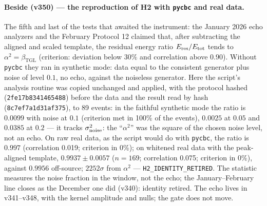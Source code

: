 \documentclass[11pt]{article}
\newcommand{\bTGL}{\beta_{\mathrm{TGL}}}\newcommand{\Msun}{M_{\odot}}\newcommand{\TGL}{\mathrm{TGL}}
\theoremstyle{definition}\newtheorem{deriv}{Derivation}
\begin{document}
\paragraph*{Beside (v350) --- the reproduction of H2 with \texttt{pycbc} and real data.} The fifth and last of the tests that awaited the instrument: the January 2026 echo analyzers and the February Protocol 12 claimed that, after subtracting the aligned and scaled template, the residual energy ratio $E_{\rm res}/E_{\rm tot}$ tends to $\alpha^2=\bTGL$ (criterion: deviation below $30\%$ and correlation above $0.90$). Without \texttt{pycbc} they ran in synthetic mode: data equal to the consistent generator plus noise of level $0.1$, no echo, against the noiseless generator. Here the script's analysis routine was copied unchanged and applied, with the protocol hashed (\texttt{2fe17b8341465488}) before the data and the result read by hash (\texttt{8c7ef7a1d31af375}), to 89 events: in the faithful synthetic mode the ratio is $0.0099$ with noise at $0.1$ (criterion met in 100\% of the events), $0.0025$ at $0.05$ and $0.0385$ at $0.2$ --- it tracks $\sigma_{\rm noise}^2$: the ``$\alpha^2$'' was the square of the chosen noise level, not an echo. On raw real data, as the script would do with \texttt{pycbc}, the ratio is $0.997$ (correlation 0.019; criterion in 0\%); on whitened real data with the peak-aligned template, $0.9937\pm0.0057$ ($n=169$; correlation 0.075; criterion in 0\%), against $0.9956$ off-source; $2252\sigma$ from $\alpha^2$ --- \texttt{H2\_IDENTITY\_RETIRED}. The statistic measures the noise fraction in the window, not the echo; the January--February line closes as the December one did (v340): identity retired. The echo lives in v341--v348, with the kernel amplitude and nulls; the gate does not move.
\end{document}

